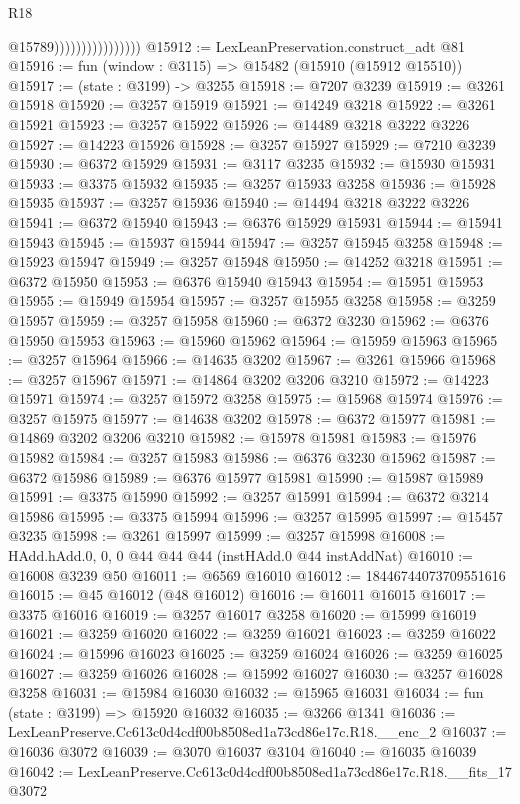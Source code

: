 \begin{lexlean}{R18}
\begin{coremodule}
                                    @15789))))))))))))))))
@15912 := LexLeanPreservation.construct_adt @81
@15916 := fun (window : @3115) => @15482 (@15910 (@15912 @15510))
@15917 := (state : @3199) -> @3255
@15918 := @7207 @3239
@15919 := @3261 @15918
@15920 := @3257 @15919
@15921 := @14249 @3218
@15922 := @3261 @15921
@15923 := @3257 @15922
@15926 := @14489 @3218 @3222 @3226
@15927 := @14223 @15926
@15928 := @3257 @15927
@15929 := @7210 @3239
@15930 := @6372 @15929
@15931 := @3117 @3235
@15932 := @15930 @15931
@15933 := @3375 @15932
@15935 := @3257 @15933 @3258
@15936 := @15928 @15935
@15937 := @3257 @15936
@15940 := @14494 @3218 @3222 @3226
@15941 := @6372 @15940
@15943 := @6376 @15929 @15931
@15944 := @15941 @15943
@15945 := @15937 @15944
@15947 := @3257 @15945 @3258
@15948 := @15923 @15947
@15949 := @3257 @15948
@15950 := @14252 @3218
@15951 := @6372 @15950
@15953 := @6376 @15940 @15943
@15954 := @15951 @15953
@15955 := @15949 @15954
@15957 := @3257 @15955 @3258
@15958 := @3259 @15957
@15959 := @3257 @15958
@15960 := @6372 @3230
@15962 := @6376 @15950 @15953
@15963 := @15960 @15962
@15964 := @15959 @15963
@15965 := @3257 @15964
@15966 := @14635 @3202
@15967 := @3261 @15966
@15968 := @3257 @15967
@15971 := @14864 @3202 @3206 @3210
@15972 := @14223 @15971
@15974 := @3257 @15972 @3258
@15975 := @15968 @15974
@15976 := @3257 @15975
@15977 := @14638 @3202
@15978 := @6372 @15977
@15981 := @14869 @3202 @3206 @3210
@15982 := @15978 @15981
@15983 := @15976 @15982
@15984 := @3257 @15983
@15986 := @6376 @3230 @15962
@15987 := @6372 @15986
@15989 := @6376 @15977 @15981
@15990 := @15987 @15989
@15991 := @3375 @15990
@15992 := @3257 @15991
@15994 := @6372 @3214 @15986
@15995 := @3375 @15994
@15996 := @3257 @15995
@15997 := @15457 @3235
@15998 := @3261 @15997
@15999 := @3257 @15998
@16008 := HAdd.hAdd.{0, 0, 0} @44 @44 @44 (instHAdd.{0} @44 instAddNat)
@16010 := @16008 @3239 @50
@16011 := @6569 @16010
@16012 := 18446744073709551616
@16015 := @45 @16012 (@48 @16012)
@16016 := @16011 @16015
@16017 := @3375 @16016
@16019 := @3257 @16017 @3258
@16020 := @15999 @16019
@16021 := @3259 @16020
@16022 := @3259 @16021
@16023 := @3259 @16022
@16024 := @15996 @16023
@16025 := @3259 @16024
@16026 := @3259 @16025
@16027 := @3259 @16026
@16028 := @15992 @16027
@16030 := @3257 @16028 @3258
@16031 := @15984 @16030
@16032 := @15965 @16031
@16034 := fun (state : @3199) => @15920 @16032
@16035 := @3266 @1341
@16036 := LexLeanPreserve.Cc613c0d4cdf00b8508ed1a73cd86e17c.R18.__enc_2
@16037 := @16036 @3072
@16039 := @3070 @16037 @3104
@16040 := @16035 @16039
@16042 := LexLeanPreserve.Cc613c0d4cdf00b8508ed1a73cd86e17c.R18.__fits_17 @3072

\end{coremodule}
\end{lexlean}
